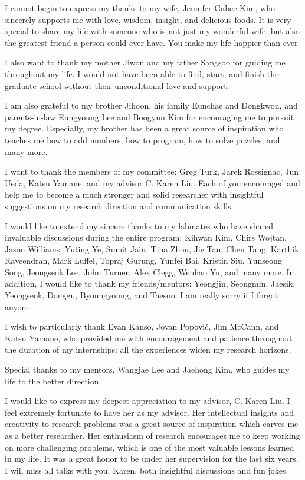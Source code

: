 I cannot begin to express my thanks to my wife, Jennifer Gahee Kim,
who sincerely supports me with love, wisdom, insight, and delicious foods.
It is very special to share my life with someone who is not just my wonderful
wife, but also the greatest friend a person could ever have.
You make my life happier than ever.

I also want to thank my mother Jiwon and my father Sangsoo for guiding me
throughout my life.
I would not have been able to find, start, and finish the graduate school without
their unconditional love and support.

I am also grateful to my brother Jihoon, his family Eunchae and Dongkwon,
and parents-in-law Eungyoung Lee and Boogyun Kim for encouraging me to pursuit
my degree.
Especially, my brother has been a great source of inspiration who teaches me
how to add numbers, how to program, how to solve puzzles, and many more.

I want to thank the members of my committee: Greg Turk, Jarek Rossignac,
Jun Ueda, Katsu Yamane, and my advisor C. Karen Liu.
Each of you encouraged and help me to become a much stronger and solid
researcher with insightful suggestions on my research direction and
communication skills.

I would like to extend my sincere thanks to my labmates
who have shared invaluable discussions during the entire program:
Kihwan Kim, Chirs Wojtan, Jason Williams, Yuting Ye, Sumit Jain,
Tina Zhou, Jie Tan, Chen Tang, Karthik Raveendran, Mark Luffel,
Topraj Gurung, Yunfei Bai, Kristin Siu, Yunseong Song, Jeongseok Lee,
John Turner, Alex Clegg, Wenhao Yu, and many more.
In addition, I would like to thank my friends/mentors: Yeongjin, Seongmin,
Jaesik, Yeongseok, Donggu, Byoungyoung, and Taesoo.
I am really sorry if I forgot anyone.

I wish to particularly thank Evan Kanso, Jovan Popovi\'{c}, Jim McCann, and
Katsu Yamane, who provided me with encouragement and patience throughout the
duration of my internships: all the experiences widen my research horizons.

Special thanks to my mentors, Wangjae Lee and Jaehong Kim, who
guides my life to the better direction.

I would like to express my deepest appreciation to my advisor, C. Karen Liu.
I feel extremely fortunate to have her as my advisor.
Her intellectual insights and creativity to research problems was a great
source of inspiration which carves me as a better researcher.
Her enthusiasm of research encourages me to keep working on more challenging
problems, which is one of the most valuable lessons learned in my life.
It was a great honor to be under her supervision for the last six years.
I will miss all talks with you, Karen, both insightful discussions and fun jokes. 












